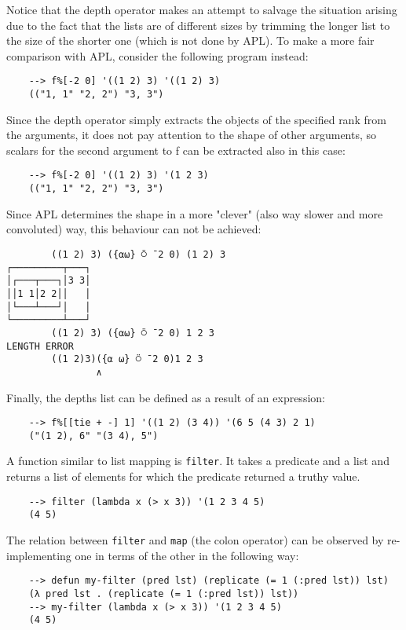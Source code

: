 Notice that the depth operator makes an attempt to salvage the situation arising due to the fact that the lists are of different sizes by trimming the longer list to the size of the shorter one (which is not done by APL). To make a more fair comparison with APL, consider the following program instead:

\begin{Verbatim}
    --> f%[-2 0] '((1 2) 3) '((1 2) 3)
    (("1, 1" "2, 2") "3, 3")
\end{Verbatim}

Since the depth operator simply extracts the objects of the specified rank from the arguments, it does not pay attention to the shape of other arguments, so scalars for the second argument to f can be extracted also in this case:

\begin{Verbatim}
    --> f%[-2 0] '((1 2) 3) '(1 2 3)
    (("1, 1" "2, 2") "3, 3")
\end{Verbatim}

Since APL determines the shape in a more "clever" (also way slower and more convoluted) way, this behaviour can not be achieved:

\begin{Verbatim}
        ((1 2) 3) ({⍺⍵} ⍥ ¯2 0) (1 2) 3
┌─────────┬───┐
│┌───┬───┐│3 3│
││1 1│2 2││   │
│└───┴───┘│   │
└─────────┴───┘
        ((1 2) 3) ({⍺⍵} ⍥ ¯2 0) 1 2 3
LENGTH ERROR
        ((1 2)3)({⍺ ⍵} ⍥ ¯2 0)1 2 3
                ∧
\end{Verbatim}

Finally, the depths list can be defined as a result of an expression:

\begin{Verbatim}
    --> f%[[tie + -] 1] '((1 2) (3 4)) '(6 5 (4 3) 2 1)
    ("(1 2), 6" "(3 4), 5")
\end{Verbatim}

A function similar to list mapping is \verb|filter|. It takes a predicate and a list and returns a list of elements for which the predicate returned a truthy value.

\begin{Verbatim}
    --> filter (lambda x (> x 3)) '(1 2 3 4 5)
    (4 5)
\end{Verbatim}

The relation between \verb|filter| and \verb|map| (the colon operator) can be observed by re-implementing one in terms of the other in the following way:

\begin{Verbatim}
    --> defun my-filter (pred lst) (replicate (= 1 (:pred lst)) lst)
    (λ pred lst . (replicate (= 1 (:pred lst)) lst))
    --> my-filter (lambda x (> x 3)) '(1 2 3 4 5)
    (4 5)
\end{Verbatim}

